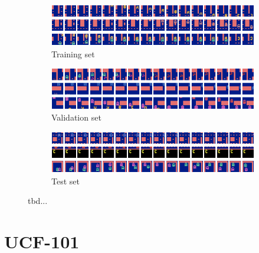 \begin{figure}[htpb]
\centering
\begin{subfigure}{1.0\textwidth}
  \centering
  \includegraphics[width=1.0\linewidth]{figures/ds/pac_train.png}
  \caption{Training set}
  \label{fig:pac_train}
  \vspace{.1cm}
\end{subfigure}
\begin{subfigure}{1.0\textwidth}
  \centering
  \includegraphics[width=1.0\linewidth]{figures/ds/pac_valid.png}
  \caption{Validation set}
  \label{fig:pac_valid}
  \vspace{.1cm}
\end{subfigure}
\begin{subfigure}{1.0\textwidth}
  \centering
  \includegraphics[width=1.0\linewidth]{figures/ds/pac_test.png}
  \caption{Test set}
  \label{fig:pac_test}
\end{subfigure}
\caption[MsPacman Image Sequence Samples]{tbd...}
\label{fig:pacman}
\end{figure}


\section{UCF-101}

